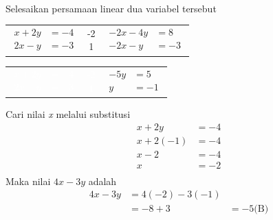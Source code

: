 \documentclass{report}
\begin{document}
\begin{enumerate}
\begin{align*}
	\end{align*}
	Selesaikan persamaan linear dua variabel tersebut
	\begin{center}
	\begin{tabular}{c|c|c}
		\parbox{3cm}{
			\begin{align*}
			x+2y &= -4 \\
			2x-y &= -3
			\end{align*}
		} & \parbox{0.3cm}{
			-2 \\ 1 
		} &
		\parbox{3cm}{
			\begin{align*}
			-2x-4y&=8\\
			-2x-y&=-3
			\end{align*}
		} \\
	\end{tabular} 
	\begin{tabular}{c c c}
		\parbox{3cm}{\textcolor{white}{
			\begin{align*}
			x+2y &= -4 \\
			2x-y &= -3
			\end{align*}}
		} & \parbox{0.3cm}{\textcolor{white}{
			-2 \\ 1 }
		} &
		\parbox{3cm}{
			\begin{align*}
				-5y&=5\\
				y&=-1
			\end{align*}
		} \\
	\end{tabular}
	\end{center}
	Cari nilai \emph{x} melalui substitusi
	\begin{align*}
		x+2y&=-4\\
		x+2(-1)&=-4\\
		x-2&=-4\\
		x&=-2\\
	\end{align*}
	Maka nilai $4x-3y$ adalah \\
	\begin{align*}
	4x-3y&=4(-2)-3(-1)\\
	&=-8+3
	&=-5 \text{(B)}
	\end{align*}


\end{enumerate}
\end{document}
